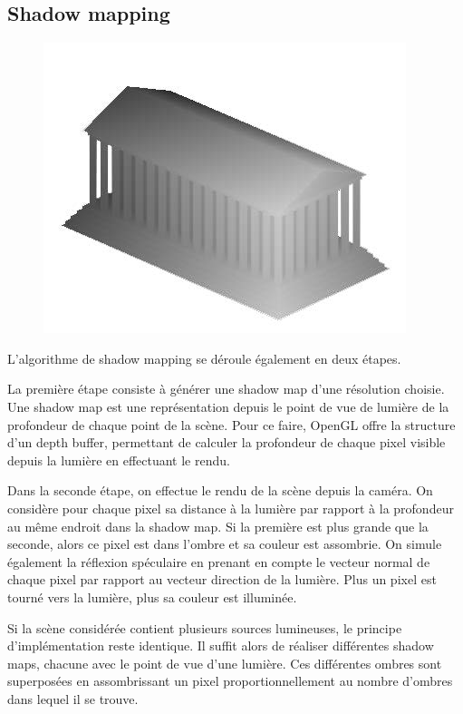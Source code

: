 \documentclass[a4paper,12pt]{report}
\begin{document}
\subsection{Shadow mapping}

\begin{figure}[H]
\includegraphics[scale=0.3]{images/shadow_map.jpg}
\centering
{}
\end{figure}

L'algorithme de shadow mapping se déroule également en deux étapes.

La première étape consiste à générer une shadow map d'une résolution choisie. Une shadow map est une représentation depuis le point de vue de lumière de la profondeur de chaque point de la scène. Pour ce faire, OpenGL offre la structure d'un depth buffer, permettant de calculer la profondeur de chaque pixel visible depuis la lumière en effectuant le rendu.

Dans la seconde étape, on effectue le rendu de la scène depuis la caméra. On considère pour chaque pixel sa distance à la lumière par rapport à la profondeur au même endroit dans la shadow map. Si la première est plus grande que la seconde, alors ce pixel est dans l'ombre et sa couleur est assombrie.
On simule également la réflexion spéculaire en prenant en compte le vecteur normal de chaque pixel par rapport au vecteur direction de la lumière. Plus un pixel est tourné vers la lumière, plus sa couleur est illuminée.

Si la scène considérée contient plusieurs sources lumineuses, le principe d'implémentation reste identique. Il suffit alors de réaliser différentes shadow maps, chacune avec le point de vue d'une lumière. Ces différentes ombres sont superposées en assombrissant un pixel proportionnellement au nombre d'ombres dans lequel il se trouve.
\end{document}
